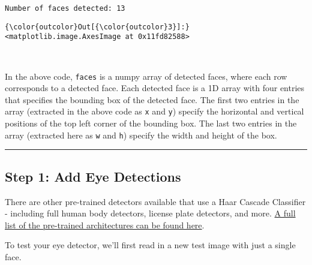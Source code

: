 \documentclass[11pt]{article}
\begin{document}
    \begin{Verbatim}[commandchars=\\\{\}]
Number of faces detected: 13

    \end{Verbatim}

\begin{Verbatim}[commandchars=\\\{\}]
{\color{outcolor}Out[{\color{outcolor}3}]:} <matplotlib.image.AxesImage at 0x11fd82588>
\end{Verbatim}
            
    \begin{center}
    \end{center}
    { \hspace*{\fill} \\}
    
    In the above code, \texttt{faces} is a numpy array of detected faces,
where each row corresponds to a detected face. Each detected face is a
1D array with four entries that specifies the bounding box of the
detected face. The first two entries in the array (extracted in the
above code as \texttt{x} and \texttt{y}) specify the horizontal and
vertical positions of the top left corner of the bounding box. The last
two entries in the array (extracted here as \texttt{w} and \texttt{h})
specify the width and height of the box.

    \begin{center}\rule{0.5\linewidth}{\linethickness}\end{center}

\hypertarget{step-1-add-eye-detections}{%
\subsection{Step 1: Add Eye
Detections}\label{step-1-add-eye-detections}}

There are other pre-trained detectors available that use a Haar Cascade
Classifier - including full human body detectors, license plate
detectors, and more.
\href{https://github.com/opencv/opencv/tree/master/data/haarcascades}{A
full list of the pre-trained architectures can be found here}.

    To test your eye detector, we'll first read in a new test image with
just a single face.
\end{document}

